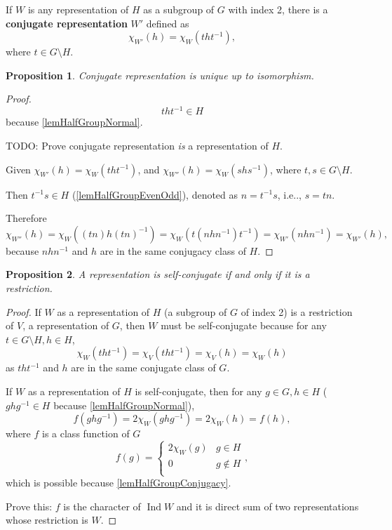 \documentclass[12pt, letterpaper]{article}
\makeatletter
\newcommand{\Ind}{\operatorname{Ind}}
\newcommand\ie{i.e\@ifnextchar.{}{.\@}}
\newcommand{\red}[1]{{\color{red} #1}}
\newtheorem{prop}{Proposition}[section]
\theoremstyle{definition}
\theoremstyle{remark}
\theoremstyle{definition}
\theoremstyle{plain}
\numberwithin{equation}{section}
\makeatother
\begin{document}
	\begin{def*}
		If $W$ is any representation of $H$ as a subgroup of $G$ with index 2,
		there is a \textbf{conjugate representation} $W'$ defined as
		\[\chi_{W'}(h)=\chi_{W}(tht^{-1}), \]
		where $t\in G\setminus H$.
	\end{def*}
	\begin{prop}
		Conjugate representation is unique up to isomorphism.
	\end{prop}
	\begin{proof}
		\[tht^{-1}\in H \] because \ref{lemHalfGroupNormal}.
		
		\red{TODO: Prove conjugate representation \textit{is} a representation of $H$.}
		
		Given $\chi_{W'}(h)=\chi_{W}(tht^{-1})$, and $\chi_{W''}(h)=\chi_{W}(shs^{-1})$,
		where $t,s\in G\setminus H$.
		
		Then $t^{-1}s\in H$ (\ref{lemHalfGroupEvenOdd}), denoted as $n=t^{-1}s$, \ie, $s=tn$.
		
		Therefore
		\[\chi_{W''}(h)=\chi_{W}((tn)h(tn)^{-1})=\chi_{W}(t(nhn^{-1})t^{-1})=\chi_{W'}(nhn^{-1})=\chi_{W'}(h),\]
		because $nhn^{-1}$ and $h$ are in the same conjugacy class of $H$.
	\end{proof}
	\begin{prop}\label{lemSelfConjugateRestriction}
		A representation is self-conjugate if and only if it is a restriction.
	\end{prop}
	\begin{proof}
		If $W$ as a representation of $H$ (a subgroup of $G$ of index 2)
		is a restriction of $V$, a representation of $G$, then
		$W$ must be self-conjugate because for any $t\in G\setminus H,h\in H$,
		\[\chi_W(tht^{-1})=\chi_V(tht^{-1})=\chi_V(h)=\chi_W(h)\]
		as $tht^{-1}$ and $h$ are in the same conjugate class of $G$.

		If $W$ as a representation of $H$ is self-conjugate,
		then for any $g\in G,h\in H$ ($ghg^{-1}\in H $ because \ref{lemHalfGroupNormal}),
		\[f(ghg^{-1})=2\chi_W(ghg^{-1})=2\chi_W(h)=f(h),\]
		where $f$ is a class function of $G$
		\[ f(g)=\begin{cases}
			2\chi_W(g)&g\in H\\
			0& g\notin H\\
		\end{cases}, \]
		which is possible because \ref{lemHalfGroupConjugacy}.
		
		\red{Prove this: $f$ is the character of $\Ind W$ and it is direct sum of two representations whose restriction
		is $W$.}
	\end{proof}
\end{document}
